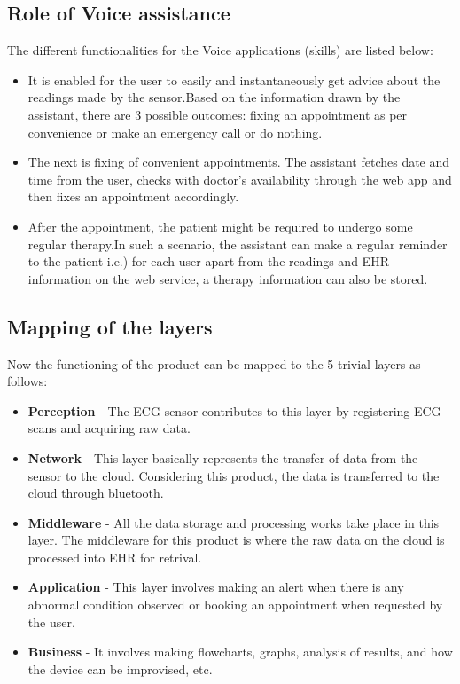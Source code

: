 \documentclass{jpp}
\begin{document}
\subsection{Role of Voice assistance}
The different functionalities for the Voice applications (skills) are listed below:
\begin{itemize}
    \item It is enabled for the user to easily and instantaneously get advice about the readings made by the sensor.Based on the information drawn by the assistant, there are 3 possible outcomes: fixing an appointment as per convenience or make an emergency call or do nothing.
    \item The next is fixing of convenient appointments. The assistant fetches date and time from the user, checks with doctor's availability through the web app and then fixes an appointment accordingly.
    \item After the appointment, the patient might be required to undergo some regular therapy.In such a scenario, the assistant can make a regular reminder to the patient i.e.) for each user apart from the readings and EHR information on the web service, a therapy
    information can also be stored.
\end{itemize}

\subsection{Mapping of the layers}
Now the functioning of the product can be mapped to the 5 trivial layers as follows:
\begin{itemize}
    \item \textbf{Perception} - The ECG sensor contributes to this layer by registering ECG scans and acquiring raw data.
    \item \textbf{Network} - This layer basically represents the transfer of data from the sensor to the cloud. Considering this product, the data is transferred to the cloud through bluetooth.
    \item \textbf{Middleware} - All the data storage and processing works take place in this layer. The middleware for this product is where the raw data on the cloud is processed into EHR for retrival.
    \item \textbf{Application} - This layer involves making an alert when there is any abnormal condition observed or booking an appointment when requested by the user.
    \item \textbf{Business} - It involves making flowcharts, graphs, analysis of results, and how the device can be improvised, etc.


\end{itemize}
\end{document}
